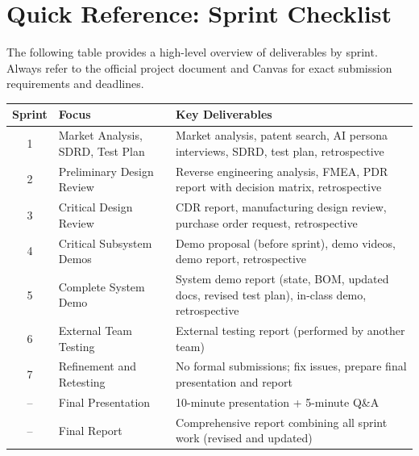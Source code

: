 \section{Quick Reference: Sprint Checklist}

The following table provides a high-level overview of deliverables by sprint. Always refer to the official project document and Canvas for exact submission requirements and deadlines.

\begin{table}[htbp]
\centering
\small
\begin{tabularx}{\textwidth}{@{} c l X @{}}
\toprule
\textbf{Sprint} & \textbf{Focus} & \textbf{Key Deliverables} \\
\midrule
1 & Market Analysis, SDRD, Test Plan & Market analysis, patent search, AI persona interviews, SDRD, test plan, retrospective \\
2 & Preliminary Design Review & Reverse engineering analysis, FMEA, PDR report with decision matrix, retrospective \\
3 & Critical Design Review & CDR report, manufacturing design review, purchase order request, retrospective \\
4 & Critical Subsystem Demos & Demo proposal (before sprint), demo videos, demo report, retrospective \\
5 & Complete System Demo & System demo report (state, BOM, updated docs, revised test plan), in-class demo, retrospective \\
6 & External Team Testing & External testing report (performed by another team) \\
7 & Refinement and Retesting & No formal submissions; fix issues, prepare final presentation and report \\
-- & Final Presentation & 10-minute presentation + 5-minute Q\&A \\
-- & Final Report & Comprehensive report combining all sprint work (revised and updated) \\
\bottomrule
\end{tabularx}
\end{table}

